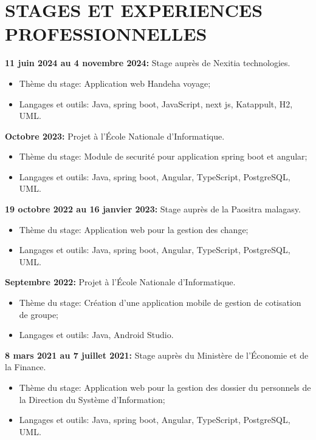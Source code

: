\documentclass[12pt]{report}
\begin{document}
			\section*{STAGES ET EXPERIENCES PROFESSIONNELLES}
			\begin{center}
				\begin{minipage}{\textwidth}
       					 \textbf{11 juin 2024 au 4 novembre 2024:} Stage auprès de Nexitia technologies.
						\begin{itemize}
							\item Thème du stage: Application web Handeha voyage;
							\item Langages et outils: Java, spring boot, JavaScript, next js, Katappult, H2, UML.						
						\end{itemize}
       					 \textbf{Octobre 2023:} Projet à l’École Nationale d'Informatique.
						\begin{itemize}
							\item Thème du stage: Module de securité pour application spring boot et angular;
							\item Langages et outils: Java, spring boot, Angular, TypeScript, PostgreSQL, UML.						
						\end{itemize}       					 
					\textbf{19 octobre 2022 au 16 janvier 2023:} Stage auprès de la Paositra malagasy.
						\begin{itemize}
							\item Thème du stage: Application web pour la gestion des change;
							\item Langages et outils: Java, spring boot, Angular, TypeScript, PostgreSQL, UML.								
						\end{itemize}
					\textbf{Septembre 2022:} Projet à l’École Nationale d'Informatique.
						\begin{itemize}
							\item Thème du stage: Création d'une application mobile de gestion de cotisation de groupe;
							\item Langages et outils: Java, Android Studio.								
						\end{itemize}
					\textbf{8 mars 2021 au 7 juillet 2021:} Stage auprès du Ministère de l’Économie et de la Finance.
						\begin{itemize}
							\item Thème du stage: Application web pour la gestion des dossier du personnels de la Direction du Système d'Information;
							\item Langages et outils: Java, spring boot, Angular, TypeScript, PostgreSQL, UML.								

\end{itemize}
\end{minipage}
\end{center}
\end{document}
